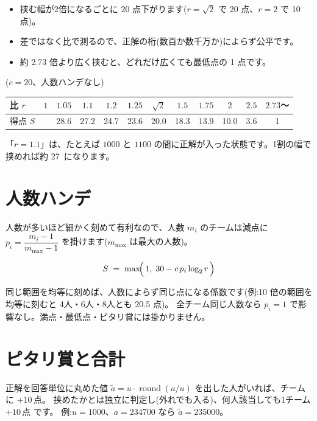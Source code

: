 \documentclass[a4paper,10.5pt]{ltjsarticle}
\newcommand{\hv}{\heavy\heavylatin}
\newcommand{\pt}[1]{#1\,\text{点}}
\newcommand{\term}[1]{{\gbold #1}}
\newcommand{\note}[1]{{\small\color{muted}#1}}
\begin{document}
\begin{itemize}
  \item 挟む幅が2倍になるごとに 20 点下がります($r=\sqrt2$ で 20 点、$r=2$ で 10 点)。
  \item 差ではなく比で測るので、正解の桁(数百か数千万か)によらず公平です。
  \item 約 2.73 倍より広く挟むと、どれだけ広くても最低点の 1 点です。
\end{itemize}

($c = 20$、人数ハンデなし)

\begin{center}
\renewcommand{\arraystretch}{1.25}
\begin{tabular}{>{\gbold}l *{11}{c}}
  \toprule
  比 $r$ & $1$ & $1.05$ & $1.1$ & $1.2$ & $1.25$ & $\sqrt2$ & $1.5$ & $1.75$ & $2$ & $2.5$ & $2.73$〜 \\
  \midrule
  得点 $S$ & \textcolor{accent}{\hv 30} & 28.6 & 27.2 & 24.7 & 23.6 & 20.0 & 18.3 & 13.9 & 10.0 & 3.6 & 1 \\
  \bottomrule
\end{tabular}
\end{center}

\noindent
\note{「$r = 1.1$」は、たとえば $\num{1000}$ と $\num{1100}$ の間に正解が入った状態です。1割の幅で挟めれば約 \pt{27} になります。}

\section{人数ハンデ}

人数が多いほど細かく刻めて有利なので、人数 $m_i$ のチームは減点に
$p_i = \dfrac{m_i - 1}{m_{\max} - 1}$ を掛けます($m_{\max}$ は最大の人数)。

\begin{keybox}
\[
  S \;=\; \max\!\Bigl(\,1,\; 30 - c\, p_i \log_2 r \,\Bigr)
\]
\end{keybox}

\noindent
同じ範囲を均等に刻めば、人数によらず同じ点になる係数です(例:10 倍の範囲を均等に刻むと 4人・6人・8人とも 20.5 点)。
全チーム同じ人数なら $p_i = 1$ で影響なし。満点・最低点・ピタリ賞には掛かりません。

\section{ピタリ賞と合計}

正解を回答単位に丸めた値 $\tilde a = u \cdot \operatorname{round}(a/u)$ を出した人がいれば、チームに \term{$+\pt{10}$}。
挟めたかとは独立に判定し(外れでも入る)、何人該当しても1チーム $+\pt{10}$ です。
例:$u = \num{1000}$、$a = \num{234700}$ なら $\tilde a = \num{235000}$。
\end{document}
